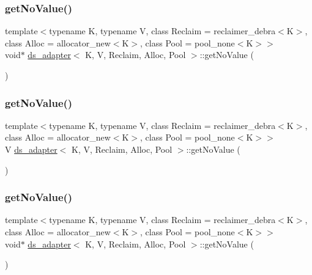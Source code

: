 \subsubsection{\texorpdfstring{get\+No\+Value()}{getNoValue()}\hspace{0.1cm}{\footnotesize\ttfamily [24/26]}}
{\footnotesize\ttfamily template$<$typename K, typename V, class Reclaim = reclaimer\+\_\+debra$<$\+K$>$, class Alloc = allocator\+\_\+new$<$\+K$>$, class Pool = pool\+\_\+none$<$\+K$>$$>$ \\
void$\ast$ \hyperlink{classds__adapter}{ds\+\_\+adapter}$<$ K, V, Reclaim, Alloc, Pool $>$\+::get\+No\+Value (\begin{DoxyParamCaption}{ }\end{DoxyParamCaption})\hspace{0.3cm}{\ttfamily [inline]}}

\mbox{\label{classds__adapter_a9e1e4aec136b351d1a6820d70484a6c5}} 
\subsubsection{\texorpdfstring{get\+No\+Value()}{getNoValue()}\hspace{0.1cm}{\footnotesize\ttfamily [25/26]}}
{\footnotesize\ttfamily template$<$typename K, typename V, class Reclaim = reclaimer\+\_\+debra$<$\+K$>$, class Alloc = allocator\+\_\+new$<$\+K$>$, class Pool = pool\+\_\+none$<$\+K$>$$>$ \\
V \hyperlink{classds__adapter}{ds\+\_\+adapter}$<$ K, V, Reclaim, Alloc, Pool $>$\+::get\+No\+Value (\begin{DoxyParamCaption}{ }\end{DoxyParamCaption})\hspace{0.3cm}{\ttfamily [inline]}}

\mbox{\label{classds__adapter_adb631e454b8146520f601d1a86c6c72c}} 
\subsubsection{\texorpdfstring{get\+No\+Value()}{getNoValue()}\hspace{0.1cm}{\footnotesize\ttfamily [26/26]}}
{\footnotesize\ttfamily template$<$typename K, typename V, class Reclaim = reclaimer\+\_\+debra$<$\+K$>$, class Alloc = allocator\+\_\+new$<$\+K$>$, class Pool = pool\+\_\+none$<$\+K$>$$>$ \\
void$\ast$ \hyperlink{classds__adapter}{ds\+\_\+adapter}$<$ K, V, Reclaim, Alloc, Pool $>$\+::get\+No\+Value (\begin{DoxyParamCaption}{ }\end{DoxyParamCaption})\hspace{0.3cm}{\ttfamily [inline]}}

